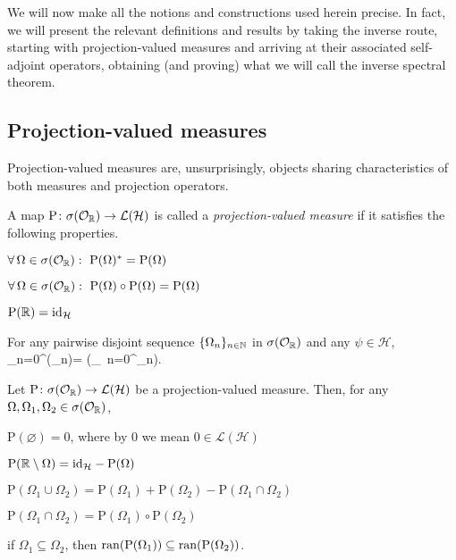 We will now make all the notions and constructions used herein precise. In fact, we will present the relevant definitions and results by taking the inverse route, starting with projection-valued measures and arriving at their associated self-adjoint operators, obtaining (and proving) what we will call the inverse spectral theorem.

\subsection{Projection-valued measures}

Projection-valued measures are, unsurprisingly, objects sharing characteristics of both measures and projection operators.

\bd
A map $\mathrm{P}\colon \sigma(\mathcal{O}_{\mathbb{R}})\to\mathcal{L}(\mathcal{H})$ is called a \emph{projection-valued measure} if it satisfies the following properties.
\ben[label=(\roman*)]
\item $\forall\, \Omega \in \sigma(\mathcal{O}_{\mathbb{R}}) : \ \mathrm{P}(\Omega)^* = \mathrm{P}(\Omega) $
\item $\forall\, \Omega \in \sigma(\mathcal{O}_{\mathbb{R}}) : \ \mathrm{P}(\Omega)\circ \mathrm{P}(\Omega) = \mathrm{P}(\Omega) $
\item $\mathrm{P}(\mathbb{R})=\operatorname{id}_{\mathcal{H}}$
\item For any pairwise disjoint sequence $\{\Omega_n\}_{n\in\mathbb{N}}$ in $\sigma(\mathcal{O}_{\mathbb{R}})$ and any $\psi\in\mathcal{H}$,
\bse
\sum_{n=0}^{\infty}(\Omega_n)\psi = \biggl(\bigcup_{\, n=0}^{\infty}\Omega_n\biggr)\psi.
\ese
\een
\ed

\bl
Let $\mathrm{P}\colon \sigma(\mathcal{O}_{\mathbb{R}})\to\mathcal{L}(\mathcal{H})$ be a projection-valued measure. Then, for any $\Omega,\Omega_1,\Omega_2\in\sigma(\mathcal{O}_{\mathbb{R}})$,
\ben[label=(\roman*)]
\item $\mathrm{P}(\varnothing)=0$, where by $0$ we mean $0\in\mathcal{L}(\mathcal{H})$
\item $\mathrm{P}(\mathbb{R}\setminus \Omega)={\operatorname{id}_{\mathcal{H}}}-\mathrm{P}(\Omega)$
\item $\mathrm{P}(\Omega_1\cup\Omega_2)=\mathrm{P}(\Omega_1)+\mathrm{P}(\Omega_2)-\mathrm{P}(\Omega_1\cap\Omega_2)$
\item $\mathrm{P}(\Omega_1\cap\Omega_2)=\mathrm{P}(\Omega_1)\circ\mathrm{P}(\Omega_2)$
\item if $\Omega_1\subseteq\Omega_2$, then $\operatorname{ran}(\mathrm{P}(\Omega_1))\subseteq \operatorname{ran}(\mathrm{P}(\Omega_2))$.
\een
\el












